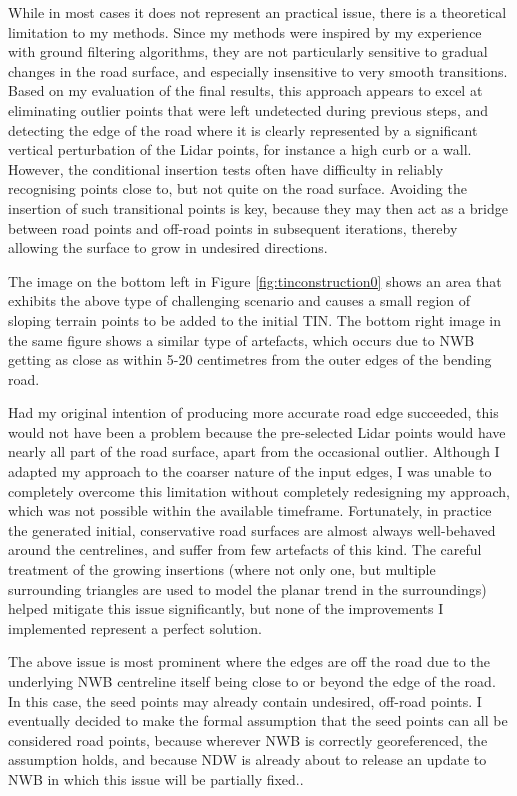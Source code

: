 While in most cases it does not represent an practical issue, there is a theoretical limitation to my methods. Since my methods were inspired by my experience with ground filtering algorithms, they are not particularly sensitive to gradual changes in the road surface, and especially insensitive to very smooth transitions. Based on my evaluation of the final results, this approach appears to excel at eliminating outlier points that were left undetected during previous steps, and detecting the edge of the road where it is clearly represented by a significant vertical perturbation of the Lidar points, for instance a high curb or a wall. However, the conditional insertion tests often have difficulty in reliably recognising points close to, but not quite on the road surface. Avoiding the insertion of such transitional points is key, because they may then act as a bridge between road points and off-road points in subsequent iterations, thereby allowing the surface to grow in undesired directions.

The image on the bottom left in Figure \ref{fig:tinconstruction0} shows an area that exhibits the above type of challenging scenario and causes a small region of sloping terrain points to be added to the initial TIN. The bottom right image in the same figure shows a similar type of artefacts, which occurs due to NWB getting as close as within 5-20 centimetres from the outer edges of the bending road.

Had my original intention of producing more accurate road edge succeeded, this would not have been a problem because the pre-selected Lidar points would have nearly all part of the road surface, apart from the occasional outlier. Although I adapted my approach to the coarser nature of the input edges, I was unable to completely overcome this limitation without completely redesigning my approach, which was not possible within the available timeframe. Fortunately, in practice the generated initial, conservative road surfaces are almost always well-behaved around the centrelines, and suffer from few artefacts of this kind. The careful treatment of the growing insertions (where not only one, but multiple surrounding triangles are used to model the planar trend in the surroundings) helped mitigate this issue significantly, but none of the improvements I implemented represent a perfect solution.

The above issue is most prominent where the edges are off the road due to the underlying NWB centreline itself being close to or beyond the edge of the road. In this case, the seed points may already contain undesired, off-road points. I eventually decided to make the formal assumption that the seed points can all be considered road points, because wherever NWB is correctly georeferenced, the assumption holds, and because NDW is already about to release an update to NWB in which this issue will be partially fixed..


